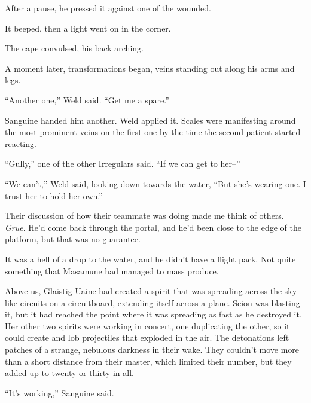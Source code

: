 After a pause, he pressed it against one of the wounded.



It beeped, then a light went on in the corner.



The cape convulsed, his back arching.



A moment later, transformations began, veins standing out along his arms and legs.



``Another one,'' Weld said.  ``Get me a spare.''



Sanguine handed him another.  Weld applied it.  Scales were manifesting around the most prominent veins on the first one by the time the second patient started reacting.



``Gully,'' one of the other Irregulars said.  ``If we can get to her--''



``We can't,'' Weld said, looking down towards the water, ``But she's wearing one.  I trust her to hold her own.''



Their discussion of how their teammate was doing made me think of others.  \emph{Grue}.  He'd come back through the portal, and he'd been close to the edge of the platform, but that was no guarantee.



It was a hell of a drop to the water, and he didn't have a flight pack.  Not quite something that Masamune had managed to mass produce.



Above us, Glaistig Uaine had created a spirit that was spreading across the sky like circuits on a circuitboard, extending itself across a plane.  Scion was blasting it, but it had reached the point where it was spreading as fast as he destroyed it.  Her other two spirits were working in concert, one duplicating the other, so it could create and lob projectiles that exploded in the air.  The detonations left patches of a strange, nebulous darkness in their wake.  They couldn't move more than a short distance from their master, which limited their number, but they added up to twenty or thirty in all.



``It's working,'' Sanguine said.



